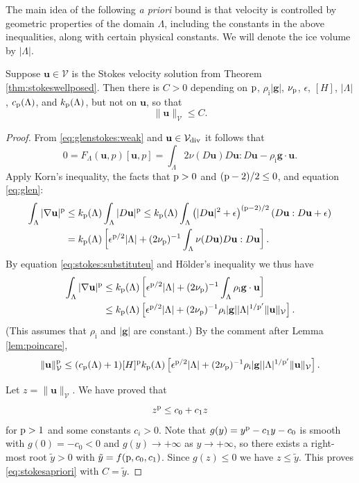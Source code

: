 \documentclass[hidelinks,onefignum,onetabnum,final]{siamart220329}  %
\newcommand{\eps}{\epsilon}
\newcommand{\grad}{\nabla}
\newcommand{\bg}{\mathbf{g}}
\newcommand{\bu}{\mathbf{u}}
\newcommand{\cV}{\mathcal{V}}
\newcommand{\pp}{{\text{\textnormal{p}}}}
\newcommand{\rhoi}{\rho_{\text{i}}}
\newcommand{\Vdiv}{\cV_{\text{\textnormal{div}}}}
\begin{document}
The main idea of the following \emph{a priori}  bound is that velocity is controlled by geometric properties of the domain $\Lambda$, including the constants in the above inequalities, along with certain physical constants.  We will denote the ice volume by $|\Lambda|$.

\begin{lemma} \label{lem:stokesapriori}
Suppose $\bu\in\cV$ is the Stokes velocity solution from Theorem \ref{thm:stokeswellposed}.  Then there is $C>0$ depending on $\pp$, $\rhoi |\bg|$, $\nu_\pp$, $\eps$, $[H]$, $|\Lambda|$, $c_\pp(\Lambda)$, and $k_\pp(\Lambda)$, but not on $\bu$, so that
\begin{equation}
\|\bu\|_{\cV} \le C. \label{eq:stokesapriori}
\end{equation}
\end{lemma}

\begin{proof}
From \eqref{eq:glenstokes:weak} and $\bu \in\Vdiv$ it follows that
\begin{equation}
0= F_\Lambda(\bu,p)[\bu,p] = \int_\Lambda 2 \nu(D\bu) D\bu : D\bu - \rhoi \bg \cdot \bu.  \label{eq:stokes:substituteu}
\end{equation}
Apply Korn's inequality, the facts that $\pp>0$ and $(\pp-2)/2 \le 0$, and equation \eqref{eq:glen}:
\begin{align}
\int_\Lambda |\grad\bu|^\pp &\le k_{\pp}(\Lambda) \int_\Lambda |D\bu|^\pp \le k_{\pp}(\Lambda) \int_\Lambda \left(|D\bu|^2 + \eps\right)^{(\pp-2)/2} \left(D\bu:D\bu + \eps\right) \label{eq:stokes:startapriori} \\
	&= k_{\pp}(\Lambda) \left[\eps^{\pp/2} |\Lambda| + (2 \nu_\pp)^{-1} \int_\Lambda \nu(D\bu) D\bu:D\bu\right]. \notag
\end{align}
By equation \eqref{eq:stokes:substituteu} and H\"older's inequality we thus have
\begin{align}
\int_\Lambda |\grad\bu|^\pp &\le k_{\pp}(\Lambda) \left[\eps^{\pp/2} |\Lambda| + (2 \nu_\pp)^{-1} \int_\Lambda \rhoi \bg \cdot \bu\right] \label{eq:stokes:workapriori} \\
	&\le k_{\pp}(\Lambda) \left[\eps^{\pp/2} |\Lambda| + (2 \nu_\pp)^{-1} \rhoi |\bg| |\Lambda|^{1/\pp'} \|\bu\|_\cV\right]. \notag
\end{align}
(This assumes that $\rhoi$ and $|\bg|$ are constant.)  By the comment after Lemma \ref{lem:poincare},
\begin{equation}
\|\bu\|_{\cV}^\pp \le (c_{\pp}(\Lambda) + 1) [H]^\pp k_{\pp}(\Lambda) \left[\eps^{\pp/2} |\Lambda| + (2 \nu_\pp)^{-1} \rhoi |\bg| |\Lambda|^{1/\pp'} \|\bu\|_\cV\right].
\end{equation}

Let $z=\|\bu\|_\cV$.  We have proved that
\begin{equation}
z^\pp \le c_0 + c_1 z
\end{equation}
for $\pp>1$ and some constants $c_i>0$.  Note that $g(y) = y^\pp - c_1 y - c_0$ is smooth with $g(0)=-c_0<0$ and $g(y) \to +\infty$ as $y \to +\infty$, so there exists a right-most root $\tilde y>0$ with $\tilde y = f(\pp,c_0,c_1)$.  Since $g(z)\le 0$ we have $z \le \tilde y$.  This proves \eqref{eq:stokesapriori} with $C=\tilde y$.
\end{proof}
\end{document}
